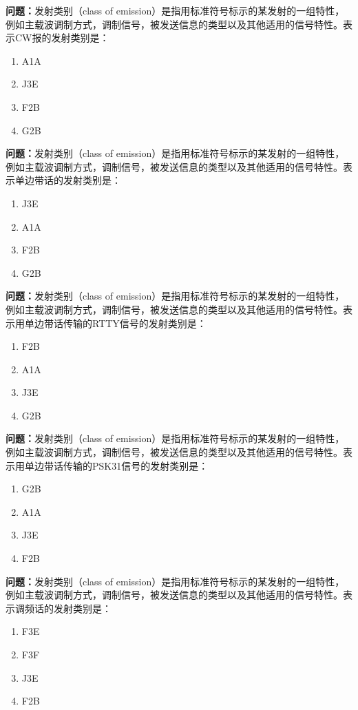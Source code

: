 \noindent\textbf{问题：}发射类别（class of emission）是指用标准符号标示的某发射的一组特性，例如主载波调制方式，调制信号，被发送信息的类型以及其他适用的信号特性。表示CW报的发射类别是：
\begin{enumerate}[label=\Alph*), leftmargin=3em]
\item A1A
\item J3E
\item F2B
\item G2B
\end{enumerate}

\bigskip


\noindent\textbf{问题：}发射类别（class of emission）是指用标准符号标示的某发射的一组特性，例如主载波调制方式，调制信号，被发送信息的类型以及其他适用的信号特性。表示单边带话的发射类别是：
\begin{enumerate}[label=\Alph*), leftmargin=3em]
\item J3E
\item A1A
\item F2B
\item G2B
\end{enumerate}

\bigskip


\noindent\textbf{问题：}发射类别（class of emission）是指用标准符号标示的某发射的一组特性，例如主载波调制方式，调制信号，被发送信息的类型以及其他适用的信号特性。表示用单边带话传输的RTTY信号的发射类别是：
\begin{enumerate}[label=\Alph*), leftmargin=3em]
\item F2B
\item A1A
\item J3E
\item G2B
\end{enumerate}

\bigskip


\noindent\textbf{问题：}发射类别（class of emission）是指用标准符号标示的某发射的一组特性，例如主载波调制方式，调制信号，被发送信息的类型以及其他适用的信号特性。表示用单边带话传输的PSK31信号的发射类别是：
\begin{enumerate}[label=\Alph*), leftmargin=3em]
\item G2B
\item A1A
\item J3E
\item F2B
\end{enumerate}

\bigskip


\noindent\textbf{问题：}发射类别（class of emission）是指用标准符号标示的某发射的一组特性，例如主载波调制方式，调制信号，被发送信息的类型以及其他适用的信号特性。表示调频话的发射类别是：
\begin{enumerate}[label=\Alph*), leftmargin=3em]
\item F3E
\item F3F
\item J3E
\item F2B
\end{enumerate}

